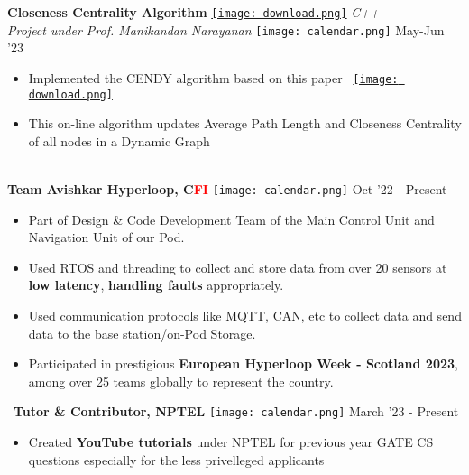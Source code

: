 \documentclass[10pt,article]{article}
\newcommand{\myMargin}{0.2in}
\newcommand{\resheading}[1]{{\small \colorbox{myblue} { \begin{minipage}{\dimexpr\linewidth-2\fboxsep}\centering{\textbf{#1 \vphantom{p\^{E}}}}\end{minipage}}}}
\newcommand{\myfont}[2]{\fontsize{#1}{#1}\selectfont #2}
\newcommand{\subheadingfont}[1]{\myfont{11pt}{#1}}
\newcommand{\projecttopic}[1]{\myfont{11pt}{\textbf{#1}}}
\newcommand{\projectdesc}[1]{\myfont{10pt}{\textcolor{projDescColor}{\textit{#1}}}}
\newcommand{\mylink}[1]{\href{#1}{\texttt{[image: download.png]}}}
\newcommand{\mycal}[1]{\texttt{[image: calendar.png]} \myfont{10}{#1}}
\begin{document}
\begin{multicols*}{2}
\noindent
\projecttopic{Closeness Centrality Algorithm} \mylink{https://github.com/Snehadeep-Gayen/CENDY-Incremental-CC}
 \hfill \textcolor{projDescColor}{\textit{C++}} \\
\projectdesc{Project under Prof. Manikandan Narayanan} \hfill \mycal{May-Jun '23}
\begin{itemize}[nolistsep, leftmargin=\myMargin]
    \item Implemented the CENDY algorithm based on this paper \ \mylink{https://ieeexplore.ieee.org/stamp/stamp.jsp?tp=&arnumber=6729571&isnumber=6729471}
    \item This on-line algorithm updates Average Path Length and Closeness Centrality of all nodes
    in a Dynamic Graph
 \end{itemize}

\noindent
\resheading{\subheadingfont{EXPERIENCE}} \\
\noindent
\projecttopic{Team Avishkar Hyperloop, C\textcolor{red}{FI}} \hfill \mycal{Oct '22 - Present} 
\begin{itemize}[nolistsep, leftmargin=\myMargin]
    \item Part of Design \& Code Development Team of the Main Control Unit and Navigation Unit of our Pod. 
    \item Used RTOS and threading to collect and store data from over 20 sensors at \textbf{low latency}, \textbf{handling faults} appropriately.
    \item Used communication protocols like MQTT, CAN, etc to collect data and send data to the base station/on-Pod Storage.
    \item Participated in prestigious \textbf{European Hyperloop Week - Scotland 2023}, 
    among over 25 teams globally to represent the country.
\end{itemize}
\noindent
\ 
\projecttopic{Tutor \& Contributor, \textcolor{nptel}{NPTEL}} \hfill \mycal{March '23 - Present} 
\begin{itemize}[noitemsep, nolistsep, leftmargin=\myMargin]
    \item Created \textbf{YouTube tutorials} under NPTEL for previous year GATE CS questions especially for the less privelleged applicants
\end{itemize}



\end{multicols*}
\end{document}
